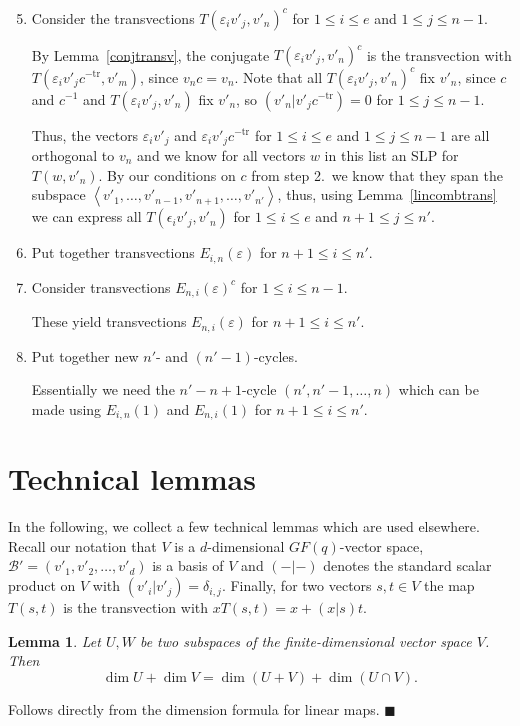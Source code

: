 \documentclass[a4paper,11pt]{article}
\newcommand{\tr}{\mathrm{tr}}
\newcommand{\proofend}{\hfill$\blacksquare$}
\newcommand{\B}{\mathcal{B}}
\newtheorem{lemma}{Lemma}
\begin{document}
\begin{enumerate}
\setcounter{enumi}{4}
\item Consider the transvections $T(\varepsilon_i v'_j,v'_n)^c$ 
for $1 \le i \le e$ and $1 \le j \le n-1$.

By Lemma~\ref{conjtransv}, 
the conjugate $T(\varepsilon_i v'_j,v'_n)^c$ is the transvection
with $T(\varepsilon_i v'_j c^{-\tr},v'_m)$,
since $v_nc = v_n$. Note that all
$T(\varepsilon_i v'_j,v'_n)^c$ fix $v'_n$, since $c$ and $c^{-1}$ and
$T(\varepsilon_i v'_j,v'_n)$ fix $v'_n$, so $(v'_n|v'_jc^{-\tr}) = 0$ 
for $1 \le j \le n-1$.

Thus, the vectors $\varepsilon_i v'_j$ and $\varepsilon_i v'_j c^{-\tr}$
for $1 \le i \le e$ and $1 \le j \le n-1$
are all orthogonal to $v_n$ and we know for all 
vectors $w$ in this list an SLP for $T(w,v'_n)$.
By our conditions on $c$ from step 2.~we know that they span the subspace
$\left< v'_1, \ldots, v'_{n-1}, v'_{n+1}, \ldots, v'_{n'}\right>$, thus,
using Lemma~\ref{lincombtrans} we can express all
$T(\epsilon_i v'_j,v'_n)$ for $1 \le i \le e$ and $n+1 \le j \le n'$.

\item Put together transvections $E_{i,n}(\varepsilon)$ for $n+1 \le i \le n'$.
\item Consider transvections $E_{n,i}(\varepsilon)^c$ for $1 \le i \le n-1$.

These yield transvections $E_{n,i}(\varepsilon)$ for $n+1 \le i \le n'$.

\item Put together new $n'$- and $(n'-1)$-cycles.

Essentially we need the $n'-n+1$-cycle $(n',n'-1, \ldots, n)$ which can 
be made using $E_{i,n}(1)$ and $E_{n,i}(1)$ for $n+1 \le i \le n'$.
\end{enumerate}

\section{Technical lemmas}

In the following, we collect a few technical lemmas which are used
elsewhere. Recall our notation that $V$ is a $d$-dimensional $GF(q)$-vector
space, $\B' = (v'_1, v'_2, \ldots, v'_d)$ is a basis of $V$ and
$(-|-)$ denotes the standard scalar product on $V$ with $(v'_i|v'_j) =
\delta_{i,j}$. Finally, for two vectors $s,t \in V$ the
map $T(s,t)$ is the transvection with $xT(s,t) = x + (x|s)t$.

\begin{lemma}
\label{dimformula}
Let $U,W$ be two subspaces of the finite-dimensional vector space $V$.
Then
\[ \dim U + \dim V = \dim(U+V) + \dim(U \cap V). \]
\end{lemma}
\proof Follows directly from the dimension formula for linear maps.
\proofend
\end{document}
